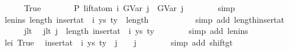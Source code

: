 \begin{isabellebody}
\ \ \ \ \isamarkupfalse%
\ True\isanewline
\ \ \ \ \isamarkupfalse%
\ \isamarkupfalse%
\ P{}{\isacharcolon}{\kern0pt}\ {\isachardoublequoteopen}lift{\isacharunderscore}{\kern0pt}atom\ i\ {\isacharparenleft}{\kern0pt}GVar\ j{\isacharparenright}{\kern0pt}\ {\isacharequal}{\kern0pt}\ GVar\ j{\isachardoublequoteclose}\isanewline
\ \ \ \ \ \ \isamarkupfalse%
\ simp\isanewline
\isanewline
\ \ \ \ \isamarkupfalse%
\ len{\isacharunderscore}{\kern0pt}ins{\isacharcolon}{\kern0pt}\ {\isachardoublequoteopen}length\ {\isacharparenleft}{\kern0pt}insert{\isacharunderscore}{\kern0pt}at\ {\isasymGamma}\ i\ {\isacharparenleft}{\kern0pt}ys{\isacharcomma}{\kern0pt}\ ty{}{\isacharparenright}{\kern0pt}{\isacharparenright}{\kern0pt}\ {\isacharequal}{\kern0pt}\ length\ {\isasymGamma}\ {\isacharplus}{\kern0pt}\ {}{\isachardoublequoteclose}\isanewline
\ \ \ \ \ \ \isamarkupfalse%
\ {\isacharparenleft}{\kern0pt}simp\ add{\isacharcolon}{\kern0pt}\ length{\isacharunderscore}{\kern0pt}insert{\isacharunderscore}{\kern0pt}at{\isacharparenright}{\kern0pt}\isanewline
\isanewline
\ \ \ \ \isamarkupfalse%
\ j{\isacharunderscore}{\kern0pt}lt\ \isamarkupfalse%
\ j{\isacharunderscore}{\kern0pt}lt{\isacharprime}{\kern0pt}{\isacharcolon}{\kern0pt}\ {\isachardoublequoteopen}j\ {\isacharless}{\kern0pt}\ length\ {\isacharparenleft}{\kern0pt}insert{\isacharunderscore}{\kern0pt}at\ {\isasymGamma}\ i\ {\isacharparenleft}{\kern0pt}ys{\isacharcomma}{\kern0pt}\ ty{}{\isacharparenright}{\kern0pt}{\isacharparenright}{\kern0pt}{\isachardoublequoteclose}\isanewline
\ \ \ \ \ \ \isamarkupfalse%
\ {\isacharparenleft}{\kern0pt}simp\ add{\isacharcolon}{\kern0pt}\ len{\isacharunderscore}{\kern0pt}ins{\isacharparenright}{\kern0pt}\isanewline
\isanewline
\ \ \ \ \isamarkupfalse%
\ le{\isacharunderscore}{\kern0pt}i\ True\ \isamarkupfalse%
\ {\isachardoublequoteopen}{\isacharparenleft}{\kern0pt}insert{\isacharunderscore}{\kern0pt}at\ {\isasymGamma}\ i\ {\isacharparenleft}{\kern0pt}ys{\isacharcomma}{\kern0pt}\ ty{}{\isacharparenright}{\kern0pt}{\isacharparenright}{\kern0pt}\ {\isacharbang}{\kern0pt}\ j\ {\isacharequal}{\kern0pt}\ {\isasymGamma}\ {\isacharbang}{\kern0pt}\ j{\isachardoublequoteclose}\isanewline
\ \ \ \ \ \ \isamarkupfalse%
\ {\isacharparenleft}{\kern0pt}simp\ add{\isacharcolon}{\kern0pt}\ shift{\isacharunderscore}{\kern0pt}gt{\isacharparenright}{\kern0pt}\isanewline

\end{isabellebody}
